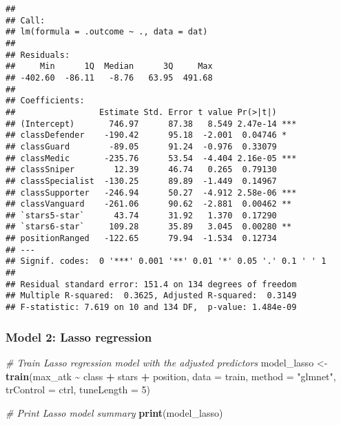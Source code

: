 \documentclass[
]{article}
\newenvironment{Shaded}{\begin{snugshade}}{\end{snugshade}}
\newcommand{\AttributeTok}[1]{\textcolor[rgb]{0.13,0.29,0.53}{#1}}
\newcommand{\CommentTok}[1]{\textcolor[rgb]{0.56,0.35,0.01}{\textit{#1}}}
\newcommand{\DecValTok}[1]{\textcolor[rgb]{0.00,0.00,0.81}{#1}}
\newcommand{\FunctionTok}[1]{\textcolor[rgb]{0.13,0.29,0.53}{\textbf{#1}}}
\newcommand{\NormalTok}[1]{#1}
\newcommand{\OtherTok}[1]{\textcolor[rgb]{0.56,0.35,0.01}{#1}}
\newcommand{\SpecialCharTok}[1]{\textcolor[rgb]{0.81,0.36,0.00}{\textbf{#1}}}
\newcommand{\StringTok}[1]{\textcolor[rgb]{0.31,0.60,0.02}{#1}}
\begin{document}
\begin{verbatim}
## 
## Call:
## lm(formula = .outcome ~ ., data = dat)
## 
## Residuals:
##     Min      1Q  Median      3Q     Max 
## -402.60  -86.11   -8.76   63.95  491.68 
## 
## Coefficients:
##                 Estimate Std. Error t value Pr(>|t|)    
## (Intercept)       746.97      87.38   8.549 2.47e-14 ***
## classDefender    -190.42      95.18  -2.001  0.04746 *  
## classGuard        -89.05      91.24  -0.976  0.33079    
## classMedic       -235.76      53.54  -4.404 2.16e-05 ***
## classSniper        12.39      46.74   0.265  0.79130    
## classSpecialist  -130.25      89.89  -1.449  0.14967    
## classSupporter   -246.94      50.27  -4.912 2.58e-06 ***
## classVanguard    -261.06      90.62  -2.881  0.00462 ** 
## `stars5-star`      43.74      31.92   1.370  0.17290    
## `stars6-star`     109.28      35.89   3.045  0.00280 ** 
## positionRanged   -122.65      79.94  -1.534  0.12734    
## ---
## Signif. codes:  0 '***' 0.001 '**' 0.01 '*' 0.05 '.' 0.1 ' ' 1
## 
## Residual standard error: 151.4 on 134 degrees of freedom
## Multiple R-squared:  0.3625, Adjusted R-squared:  0.3149 
## F-statistic: 7.619 on 10 and 134 DF,  p-value: 1.484e-09
\end{verbatim}

\subsubsection{Model 2: Lasso
regression}\label{model-2-lasso-regression}

\begin{Shaded}
\begin{Highlighting}[]
\CommentTok{\# Train Lasso regression model with the adjusted predictors}
\NormalTok{model\_lasso }\OtherTok{\textless{}{-}} \FunctionTok{train}\NormalTok{(max\_atk }\SpecialCharTok{\textasciitilde{}}\NormalTok{ class }\SpecialCharTok{+}\NormalTok{ stars }\SpecialCharTok{+}\NormalTok{ position,}
                     \AttributeTok{data =}\NormalTok{ train,}
                     \AttributeTok{method =} \StringTok{"glmnet"}\NormalTok{,}
                     \AttributeTok{trControl =}\NormalTok{ ctrl,}
                     \AttributeTok{tuneLength =} \DecValTok{5}\NormalTok{)}

\CommentTok{\# Print Lasso model summary}
\FunctionTok{print}\NormalTok{(model\_lasso)}
\end{Highlighting}
\end{Shaded}
\end{document}
